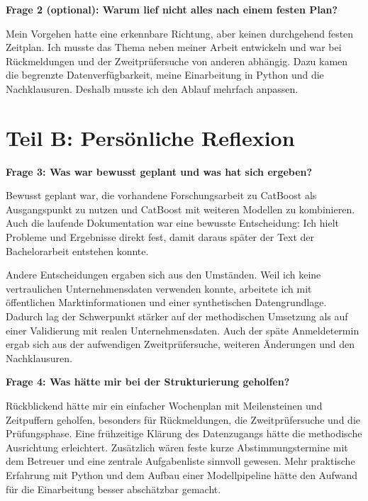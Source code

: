 \documentclass[a4paper,10pt]{article}
\begin{document}
\textbf{Frage 2 (optional): Warum lief nicht alles nach einem festen Plan?}

Mein Vorgehen hatte eine erkennbare Richtung, aber keinen durchgehend festen Zeitplan. Ich musste das Thema neben meiner Arbeit entwickeln und war bei Rückmeldungen und der Zweitprüfersuche von anderen abhängig. Dazu kamen die begrenzte Datenverfügbarkeit, meine Einarbeitung in Python und die Nachklausuren. Deshalb musste ich den Ablauf mehrfach anpassen.

\section*{Teil B: Persönliche Reflexion}
\textbf{Frage 3: Was war bewusst geplant und was hat sich ergeben?}

Bewusst geplant war, die vorhandene Forschungsarbeit zu CatBoost als Ausgangspunkt zu nutzen und CatBoost mit weiteren Modellen zu kombinieren. Auch die laufende Dokumentation war eine bewusste Entscheidung: Ich hielt Probleme und Ergebnisse direkt fest, damit daraus später der Text der Bachelorarbeit entstehen konnte.

Andere Entscheidungen ergaben sich aus den Umständen. Weil ich keine vertraulichen Unternehmensdaten verwenden konnte, arbeitete ich mit öffentlichen Marktinformationen und einer synthetischen Datengrundlage. Dadurch lag der Schwerpunkt stärker auf der methodischen Umsetzung als auf einer Validierung mit realen Unternehmensdaten. Auch der späte Anmeldetermin ergab sich aus der aufwendigen Zweitprüfersuche, weiteren Änderungen und den Nachklausuren.

\textbf{Frage 4: Was hätte mir bei der Strukturierung geholfen?}

Rückblickend hätte mir ein einfacher Wochenplan mit Meilensteinen und Zeitpuffern geholfen, besonders für Rückmeldungen, die Zweitprüfersuche und die Prüfungsphase. Eine frühzeitige Klärung des Datenzugangs hätte die methodische Ausrichtung erleichtert. Zusätzlich wären feste kurze Abstimmungstermine mit dem Betreuer und eine zentrale Aufgabenliste sinnvoll gewesen. Mehr praktische Erfahrung mit Python und dem Aufbau einer Modellpipeline hätte den Aufwand für die Einarbeitung besser abschätzbar gemacht.
\end{document}

